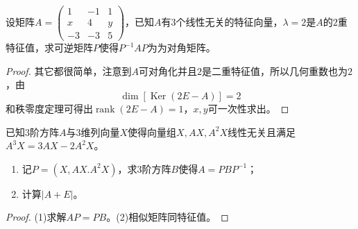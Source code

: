 \begin{theorem}
	设矩阵$A=
	\begin{pmatrix}
		1 & -1 & 1 \\
		x & 4 & y \\
		-3 & -3 & 5
	\end{pmatrix}$，已知$A$有$3$个线性无关的特征向量，$\lambda=2$是$A$的$2$重特征值，求可逆矩阵$P$使得$P^{-1}AP$为为对角矩阵。
\end{theorem}
\begin{proof}
	其它都很简单，注意到$A$可对角化并且$2$是二重特征值，所以几何重数也为$2$，由
	\begin{equation*}
		\dim[\operatorname{Ker}(2E-A)]=2
	\end{equation*}
	和秩零度定理可得出$\operatorname{rank}(2E-A)=1$，$x,y$可一次性求出。
\end{proof}
\begin{theorem}
	已知$3$阶方阵$A$与$3$维列向量$X$使得向量组$X,AX,A^2X$线性无关且满足$A^3X=3AX-2A^2X$。
	\begin{enumerate}
		\item 记$P=(X,AX.A^2X)$，求$3$阶方阵$B$使得$A=PBP^{-1}$；
		\item 计算$|A+E|$。
	\end{enumerate}
\end{theorem}
\begin{proof}
	(1)求解$AP=PB$。(2)相似矩阵同特征值。
\end{proof}
